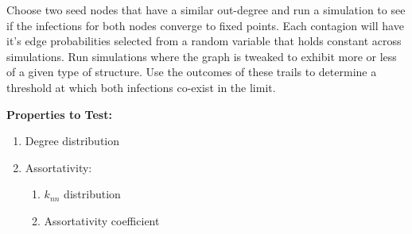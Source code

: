 \documentclass[11pt]{article}
\begin{document}
Choose two seed nodes that have a similar out-degree and run a
simulation to see if the infections for both nodes converge to 
fixed points. Each contagion will have it's edge probabilities
selected from a random variable that holds constant across simulations.
Run simulations where the graph is tweaked  to exhibit more or less
of a given type of structure. Use the outcomes of these trails to
determine a threshold at which both infections co-exist in the
limit.

\medskip

\noindent
\textbf{Properties to Test:}

 \begin{enumerate}
    \item Degree distribution
    \item Assortativity:
       \begin{enumerate}
            \item $k_{nn}$ distribution
            \item Assortativity coefficient
        \end{enumerate}
    \end{enumerate}
\end{document}
